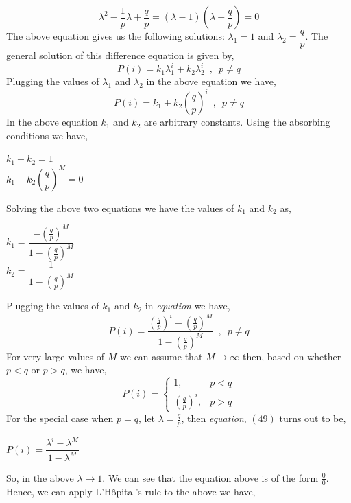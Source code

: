 \documentclass[12pt,a4paper]{article}%
\begin{document}
\begin{flushleft}
 		\begin{equation}
 		\lambda^{2}-\dfrac{1}{p}\lambda+\dfrac{q}{p}=(\lambda-1)(\lambda-\dfrac{q}{p})=0
 		\end{equation}
 		The above equation gives us the following solutions: $\lambda_1=1$ and $\lambda_2=\dfrac{q}{p}$. The general solution of this difference equation is given by,
 		\begin{equation}
 			P(i)=k_1 \lambda_1^{i} + k_2 \lambda_2^{i}\enspace , \enspace p \neq q 
 		\end{equation}
 		Plugging the values of $\lambda_1$ and $\lambda_2$ in the above equation we have,
 		\begin{equation}
 		P(i)=k_1 + k_2 (\dfrac{q}{p})^{i}\enspace , \enspace p \neq q 
 		\end{equation}
 		In the above equation $k_1$ and $k_2$ are arbitrary constants. Using the absorbing conditions we have,
 		\begin{center}
 			$k_1 + k_2 = 1$\\\smallskip
 			$k_1 + k_2(\dfrac{q}{p})^{M} = 0$
 		\end{center}
 		Solving the above two equations we have the values of $k_1$ and $k_2$ as,
 		\begin{center}
 			$k_1=\dfrac{-(\frac{q}{p})^{M}}{1-(\frac{q}{p})^{M}}$\\\smallskip
 			$k_2=\dfrac{1}{1-(\frac{q}{p})^{M}}$
 		\end{center}
 		Plugging the values of $k_1$ and $k_2$ in \textit{equation} we have,
 		\begin{equation}
 			\boxed{P(i)=\dfrac{(\frac{q}{p})^{i}-(\frac{q}{p})^{M}}{1-(\frac{q}{p})^{M}} \enspace, \enspace p \neq q}
 		\end{equation}
 		For very large values of $M$ we can assume that $M \rightarrow \infty$ then, based on whether $p<q$ or $p>q$, we have,
 		\begin{equation}
 		P(i)=
 		\begin{cases}
 		1,& p<q\\
 		(\frac{q}{p})^{i},& p>q
 		\end{cases}
 		\end{equation}
 		For the special case when $p=q$, let $\lambda = \frac{q}{p}$, then \textit{equation}, $(49)$ turns out to be,
 		\begin{center}
 			$P(i)=\dfrac{\lambda^{i}-\lambda^{M}}{1-\lambda^{M}}$
 		\end{center}
 		So, in the above $\lambda \rightarrow 1$. We can see that the equation above is of the form $\frac{0}{0}$. Hence, we can apply L'Hôpital's rule to the above we have,

\end{flushleft}
\end{document}
